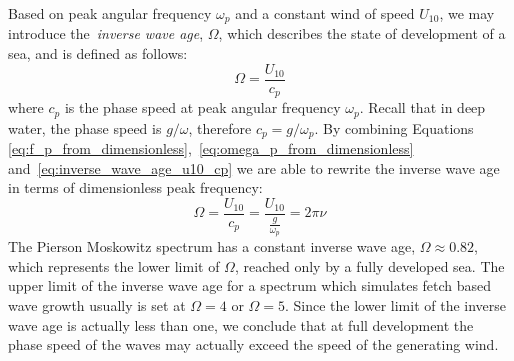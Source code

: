 Based on peak angular frequency $\omega_p$ and a constant wind of speed $U_{10}$, 
we may introduce the~\emph{inverse wave age}, $\Omega$, which describes the 
state of development of a sea, and is defined as follows:
\begin{equation}
\label{eq:inverse_wave_age_u10_cp}
 \Omega = \frac{U_{10}}{c_p}
\end{equation}
where $c_p$ is the phase speed at peak angular frequency $\omega_p$. Recall that 
in deep water, the phase speed is $g/\omega$, therefore $c_p = g/\omega_p$. By 
combining Equations 
\ref{eq:f_p_from_dimensionless},~\ref{eq:omega_p_from_dimensionless} 
and~\ref{eq:inverse_wave_age_u10_cp} we are able to rewrite the inverse wave 
age in terms of dimensionless peak frequency:
\begin{equation*}
 \Omega = \frac{U_{10}}{c_p} = \frac{U_{10}}{\frac{g}{\omega_p}} = 2\pi\nu
\end{equation*}
The Pierson Moskowitz spectrum has a constant inverse wave age, $\Omega
\approx 0.82$, which represents the lower limit of $\Omega$, reached only by a 
fully developed sea. The upper limit of the inverse wave age for a spectrum 
which simulates fetch based wave growth usually is set at $\Omega = 4$ or 
$\Omega = 5$. Since the lower limit of the inverse wave age is actually less 
than one, we conclude that at full development the phase speed of the waves may 
actually exceed the speed of the generating wind.
%
